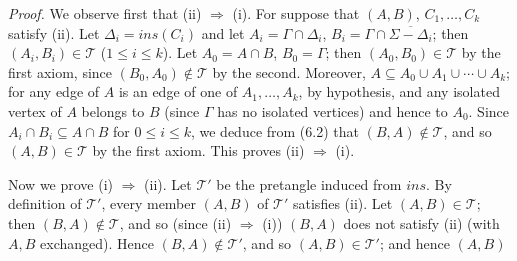 \textit{Proof.} We observe first that (ii) $\Rightarrow$ (i). For suppose that $(A, B)$, $C_1, \dots, C_k$ satisfy (ii). Let $\Delta_i = ins(C_i)$ and let $A_i = \Gamma \cap \Delta_i$, $B_i = \Gamma \cap \overline{\Sigma - \Delta_i}$; then $(A_i, B_i) \in \mathscr{T}$ ($1 \le i \le k$). Let $A_0 = A \cap B$, $B_0 = \Gamma$; then $(A_0, B_0) \in \mathscr{T}$ by the first axiom, since $(B_0, A_0) \notin \mathscr{T}$ by the second. Moreover, $A \subseteq A_0 \cup A_1 \cup \cdots \cup A_k$; for any edge of $A$ is an edge of one of $A_1, \dots, A_k$, by hypothesis, and any isolated vertex of $A$ belongs to $B$ (since $\Gamma$ has no isolated vertices) and hence to $A_0$. Since $A_i \cap B_i \subseteq A \cap B$ for $0 \le i \le k$, we deduce from (6.2) that $(B, A) \notin \mathscr{T}$, and so $(A, B) \in \mathscr{T}$ by the first axiom. This proves (ii) $\Rightarrow$ (i).

Now we prove (i) $\Rightarrow$ (ii). Let $\mathscr{T}'$ be the pretangle induced from $ins$. By definition of $\mathscr{T}'$, every member $(A, B)$ of $\mathscr{T}'$ satisfies (ii). Let $(A, B) \in \mathscr{T}$; then $(B, A) \notin \mathscr{T}$, and so (since (ii) $\Rightarrow$ (i)) $(B, A)$ does not satisfy (ii) (with $A, B$ exchanged). Hence $(B, A) \notin \mathscr{T}'$, and so $(A, B) \in \mathscr{T}'$; and hence $(A, B)$
